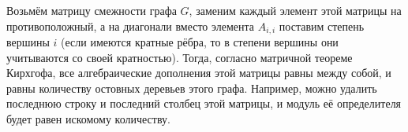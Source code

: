 Возьмём матрицу смежности графа $G$, заменим каждый элемент этой матрицы на противоположный, а на диагонали вместо элемента $A_{i,i}$ поставим степень вершины $i$ (если имеются кратные рёбра, то в степени вершины они учитываются со своей кратностью). Тогда, согласно матричной теореме Кирхгофа, все алгебраические дополнения этой матрицы равны между собой, и равны количеству остовных деревьев этого графа. Например, можно удалить последнюю строку и последний столбец этой матрицы, и модуль её определителя будет равен искомому количеству.
